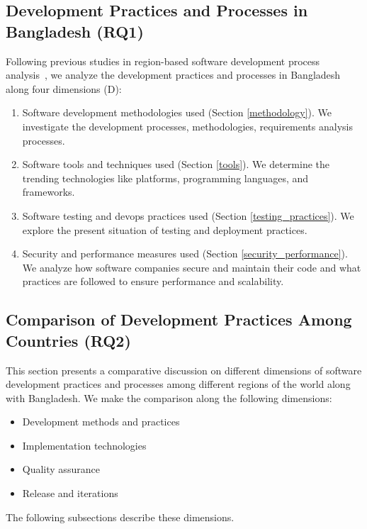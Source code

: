 \subsection{Development Practices and Processes in Bangladesh (RQ1)}
\label{RQ1}
Following previous studies in region-based software development process analysis~\citep{Garousi2013, Garousi2015, Vonken2012, Wang2018}, we 
analyze the development practices and processes in Bangladesh along four dimensions (D):
\begin{enumerate}[label=D\arabic{*}., leftmargin=20pt]
  \item Software development methodologies used (Section \ref{methodology}). We investigate the development
processes, methodologies, requirements analysis processes.
  \item Software tools and techniques used (Section \ref{tools}). We determine the
trending technologies like platforms, programming languages, and frameworks.
\item Software testing and devops practices used (Section \ref{testing_practices}). We explore the
present situation of testing and deployment practices.
\item Security and performance measures used (Section \ref{security_performance}). We analyze how
software companies secure and maintain their code and what practices are
followed to ensure performance and scalability.
\end{enumerate}






\subsection{Comparison of Development Practices Among Countries (RQ2)}
\label{RQ2}

This section presents a comparative discussion on different dimensions of software development practices and processes among different regions of the world along with Bangladesh. We make the comparison along the following dimensions:

\begin{itemize}
\item Development methods and practices
\item Implementation technologies
\item Quality assurance
\item Release and iterations
\end{itemize}

The following subsections describe these dimensions.




% 





% 
% 
